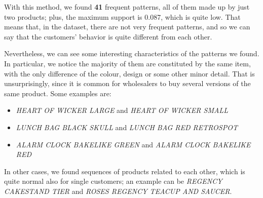 With this method, we found \textbf{41} frequent patterns, all of them made up by just two products; plus, the maximum support is 0.087, which is quite low. That means that, in the dataset, there are not very frequent patterns, and so we can say that the customers' behavior is quite different from each other.

Nevertheless, we can see some interesting characteristics of the patterns we found.\\
In particular, we notice the majority of them are constituted by the same item, with the only difference of the colour, design or some other minor detail. That is unsurprisingly, since it is common for wholesalers to buy several versions of the same product. Some examples are:
\begin{itemize}
\item \emph{HEART OF WICKER LARGE} and \emph{HEART OF WICKER SMALL} 
\item \emph{LUNCH BAG BLACK SKULL} and \emph{LUNCH BAG RED RETROSPOT}
\item \emph{ALARM CLOCK BAKELIKE GREEN} and \emph{ALARM CLOCK BAKELIKE RED}
\end{itemize}

In other cases, we found sequences of products related to each other, which is quite normal also for single customers; an example can be \emph{REGENCY CAKESTAND TIER} and \emph{ROSES REGENCY TEACUP AND SAUCER}.
